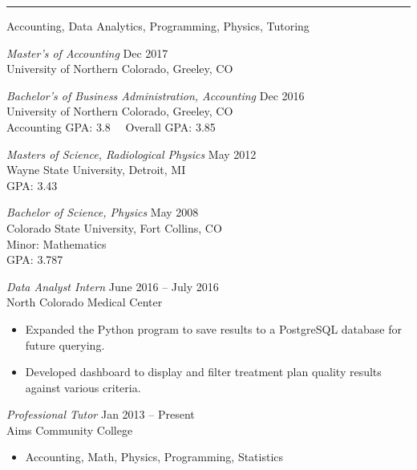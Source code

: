 \documentclass{article}
\begin{document}
\vskip2mm
\hrule
{}

\begin{description}[leftmargin=!,labelwidth=3cm]

\item[Summary of]
Accounting, Data Analytics, Programming, Physics, Tutoring
\vspace{-2.5mm}
\item[Qualifications]


\item[Education]
{\sl Master's of Accounting} \hfill Dec 2017\\
University of Northern Colorado, Greeley, CO

{\sl Bachelor's of Business Administration, Accounting} \hfill Dec 2016\\
University of Northern Colorado, Greeley, CO\\
Accounting GPA: 3.8 \qquad\ \  Overall GPA: 3.85

{\sl Masters of Science, Radiological Physics} \hfill May 2012\\
Wayne State University, Detroit, MI\\
GPA: 3.43

{\sl Bachelor of Science, Physics} \hfill May 2008\\
Colorado State University, Fort Collins, CO \\
Minor: Mathematics\\
GPA: 3.787

\item[Experience]
{\sl Data Analyst Intern} \hfill June 2016 -- July 2016\\North Colorado Medical Center
\begin{itemize}[rightmargin=4.3cm]
    \item Expanded the Python program to save results to a PostgreSQL database for future querying.
    \item Developed dashboard to display and filter treatment plan quality results against various criteria.
\end{itemize}

{\sl Professional Tutor} \hfill Jan 2013 -- Present\\Aims Community College
\begin{itemize}[rightmargin=4.3cm]
    \item Accounting, Math, Physics, Programming, Statistics
\end{itemize}


\end{description}
\end{document}
